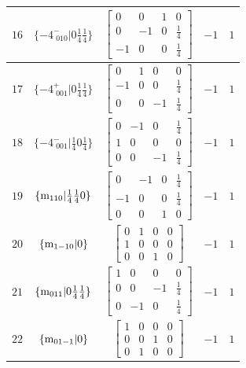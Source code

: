 \documentclass[fleqn,8pt]{jsarticle}
\begin{document}
\begin{longtable}{ccccc}
$ 16 $ & $ \{-4^{-}_{\,\,010}|0 \frac{1}{4} \frac{1}{4}\} $ & $ \begin{bmatrix} 0 & 0 & 1 & 0 \\ 0 & -1 & 0 & \frac{1}{4} \\ -1 & 0 & 0 & \frac{1}{4} \end{bmatrix} $ & $ -1 $ & $ 1 $ \\ \hline
$ 17 $ & $ \{-4^{+}_{\,\,001}|0 \frac{1}{4} \frac{1}{4}\} $ & $ \begin{bmatrix} 0 & 1 & 0 & 0 \\ -1 & 0 & 0 & \frac{1}{4} \\ 0 & 0 & -1 & \frac{1}{4} \end{bmatrix} $ & $ -1 $ & $ 1 $ \\ \hline
$ 18 $ & $ \{-4^{-}_{\,\,001}|\frac{1}{4} 0 \frac{1}{4}\} $ & $ \begin{bmatrix} 0 & -1 & 0 & \frac{1}{4} \\ 1 & 0 & 0 & 0 \\ 0 & 0 & -1 & \frac{1}{4} \end{bmatrix} $ & $ -1 $ & $ 1 $ \\ \hline
$ 19 $ & $ \{{\rm m}_{110}|\frac{1}{4} \frac{1}{4} 0\} $ & $ \begin{bmatrix} 0 & -1 & 0 & \frac{1}{4} \\ -1 & 0 & 0 & \frac{1}{4} \\ 0 & 0 & 1 & 0 \end{bmatrix} $ & $ -1 $ & $ 1 $ \\ \hline
$ 20 $ & $ \{{\rm m}_{1-10}|0\} $ & $ \begin{bmatrix} 0 & 1 & 0 & 0 \\ 1 & 0 & 0 & 0 \\ 0 & 0 & 1 & 0 \end{bmatrix} $ & $ -1 $ & $ 1 $ \\ \hline
$ 21 $ & $ \{{\rm m}_{011}|0 \frac{1}{4} \frac{1}{4}\} $ & $ \begin{bmatrix} 1 & 0 & 0 & 0 \\ 0 & 0 & -1 & \frac{1}{4} \\ 0 & -1 & 0 & \frac{1}{4} \end{bmatrix} $ & $ -1 $ & $ 1 $ \\ \hline
$ 22 $ & $ \{{\rm m}_{01-1}|0\} $ & $ \begin{bmatrix} 1 & 0 & 0 & 0 \\ 0 & 0 & 1 & 0 \\ 0 & 1 & 0 & 0 \end{bmatrix} $ & $ -1 $ & $ 1 $ \\ \hline

\end{longtable}
\end{document}
